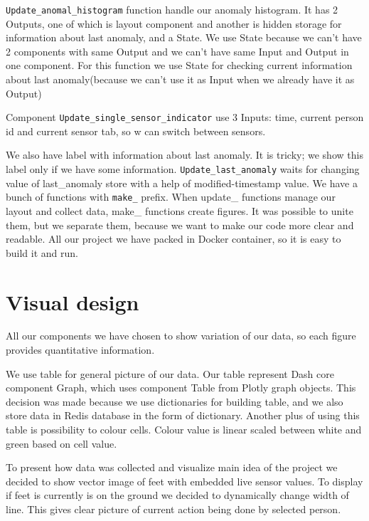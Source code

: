 \documentclass{article}
\begin{document}
\texttt{Update\_anomal\_histogram} function handle our anomaly histogram. It has 2 Outputs, one of which is layout component and another is hidden storage for information about last anomaly, and a State. We use State because we can't have 2 components with same Output and we can't have same Input and Output in one component. For this function we use State for checking current information about last anomaly(because we can't use it as Input when we already have it as Output)

Component \texttt{Update\_single\_sensor\_indicator} use 3 Inputs: time, current person id and current sensor tab, so w can switch between sensors.

We also have label with information about last anomaly. It is tricky; we show this label only if we have some information. \texttt{Update\_last\_anomaly} waits for changing value of last\_anomaly store with a help of modified-timestamp value.
\newline
We have a bunch of functions with \texttt{make\_} prefix. When update\_ functions manage our layout and collect data, make\_ functions create figures. It was possible to unite them, but we separate them, because we want to make our code more clear and readable.
\newline
All our project we have packed in Docker container, so it is easy to build it and run.

\section{Visual design}

All our components we have chosen to show variation of our data, so each figure provides quantitative information.
\vspace{10pt}

We use table for general picture of our data. Our table represent Dash core component Graph, which uses component Table from Plotly graph objects. This decision was made because we use dictionaries for building table, and we also store data in Redis database in the form of dictionary. Another plus of using this table is possibility to colour cells. Colour value is linear scaled between white and green based on cell value.
\vspace{10pt}

To present how data was collected and visualize main idea of the project we decided to show vector image of feet with embedded live sensor values. To display if feet is currently is on the ground we decided to dynamically change width of line. This gives clear picture of current action being done by selected person. 
\vspace{10pt}
\end{document}
